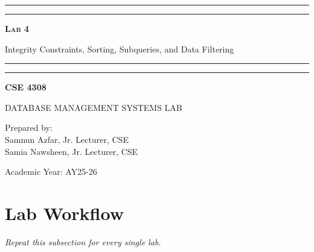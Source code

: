 \documentclass[12pt,a4paper]{article}
\newcommand{\labNo}{Lab 4}
\newcommand{\labTopic}{Integrity Constraints, Sorting, Subqueries, and Data Filtering}
\newcommand{\courseCode}{CSE 4308}
\newcommand{\courseTitleLong}{DATABASE MANAGEMENT SYSTEMS LAB}
\newcommand{\instructorName}{Samnun Azfar, Jr. Lecturer, CSE\\ Samia Nawsheen, Jr. Lecturer, CSE}
\newcommand{\academicYear}{AY25-26}
\begin{document}
\begin{titlepage}
    \centering
    \vspace*{2\baselineskip}

    \rule{14cm}{2pt}\vspace*{-0.8\baselineskip}\vspace*{1.5pt}
    \rule{14cm}{0.5pt}\vspace{2\baselineskip}

    {\Huge\bfseries\scshape \labNo\par} %
    \vspace{3mm}
    {\Large \labTopic} %
    \vspace{3mm}

    \rule{14cm}{0.5pt}\vspace*{-0.7\baselineskip}\vspace{2.5pt}
    \rule{14cm}{2pt}

    \vspace{2\baselineskip}

    {\Large\bfseries \courseCode\par} %
    \vspace{1\baselineskip}
    {\large \courseTitleLong\par} %

    \vfill
    {\normalsize Prepared by:\\ \instructorName\par} %
    {\normalsize Academic Year: \academicYear\par} %
\end{titlepage}

\newpage
\tableofcontents
\newpage
\section*{Lab Workflow}



\textit{Repeat this subsection for every single lab.}
\end{document}
